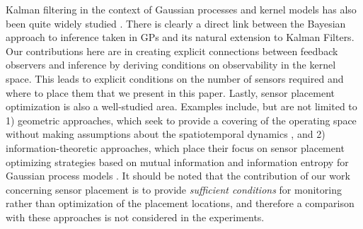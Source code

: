 Kalman filtering in the context of Gaussian processes and kernel models has also been quite widely studied \cite{carron2016machine,hartikainen2010kalman,sarkka2013spatiotemporal,stroud2001dynamic,miller1986toward}.  There is clearly a direct link between the Bayesian approach to inference taken in GPs and its natural extension to Kalman Filters. Our contributions here are in creating explicit connections between feedback observers and inference by deriving conditions on observability in the kernel space. This leads to explicit conditions on the number of sensors required and where to place them that we present in this paper. Lastly, sensor placement optimization is also a well-studied area. Examples include, but are not limited to 1) geometric approaches, which seek to provide a covering of the operating space without making assumptions about the spatiotemporal dynamics \cite{egerstedt:bk:2010}, and 2) information-theoretic approaches, which place their focus on sensor placement optimizing strategies based on mutual information and information entropy for Gaussian process models \cite{Guestrin05_ICML}.
It should be noted that the contribution of our work concerning sensor placement is to provide \emph{sufficient conditions} for monitoring rather than optimization of the placement locations, and therefore a comparison with these approaches is not considered in the experiments. 

